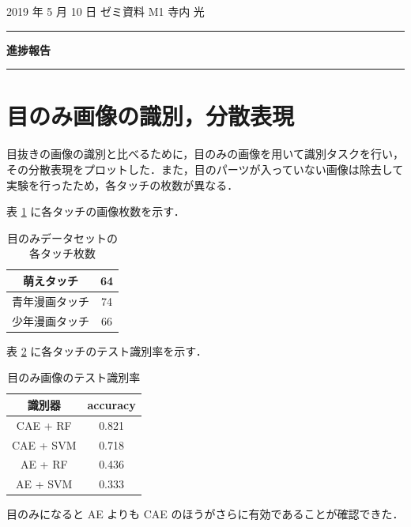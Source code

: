\documentclass[onecolumn]{ujarticle}     %
\begin{document}
	
	
	\noindent
	
	\hspace{1em}
	2019 年 5 月 10 日
	ゼミ資料
	\hfill
	M1 寺内 光
	
	\vspace{2mm}
	
	\hrule
	
	\begin{center}
		{\Large \bf 進捗報告}
	\end{center}
	
	
	\hrule
	\vspace{3mm}
	
	\section{目のみ画像の識別，分散表現}
	目抜きの画像の識別と比べるために，目のみの画像を用いて識別タスクを行い，その分散表現をプロットした．また，目のパーツが入っていない画像は除去して実験を行ったため，各タッチの枚数が異なる．
	
	表 \ref{tab:num_image} に各タッチの画像枚数を示す．
	\begin{table}[h]
		\centering
		\caption{目のみデータセットの各タッチ枚数}
		\begin{tabular}{|c|c|} \hline
			萌えタッチ&64\\ \hline
			青年漫画タッチ&74\\ \hline
			少年漫画タッチ&66\\ \hline
		\end{tabular}
		\label{tab:num_image}
	\end{table}

	表 \ref{tab:accuracy} に各タッチのテスト識別率を示す．
	\begin{table}[h]
		\centering
		\caption{目のみ画像のテスト識別率}
		\begin{tabular}{|c|c|} \hline
			識別器&accuracy\\ \hline
			CAE + RF&0.821\\ \hline
			CAE + SVM&0.718\\ \hline
			AE + RF&0.436\\ \hline
			AE + SVM&0.333\\ \hline
		\end{tabular}
		\label{tab:accuracy}
	\end{table}

	目のみになると AE よりも CAE のほうがさらに有効であることが確認できた．
	
\end{document}
